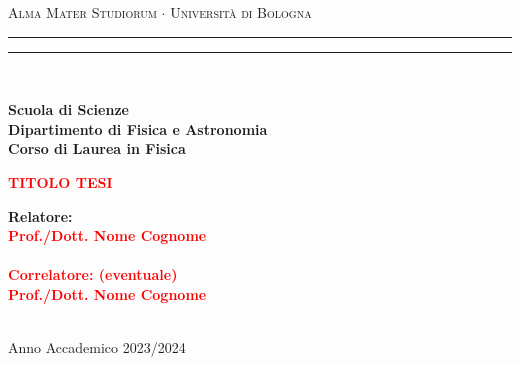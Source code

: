 \documentclass[12pt,a4paper,twoside]{report}
\begin{document}
	\begin{titlepage}
		\begin{center}
			{{\Large{\textsc{Alma Mater Studiorum $\cdot$ Universit\`a di Bologna}}}} 
			\rule[0.1cm]{15.8cm}{0.1mm}
			\rule[0.5cm]{15.8cm}{0.6mm}
			\\\vspace{3mm}
			
			{\small{\bf Scuola di Scienze \\ 
					Dipartimento di Fisica e Astronomia\\
					Corso di Laurea in Fisica}}
			
		\end{center}
		
		\vspace{23mm}
		
		\begin{center}\textcolor{red}{
				{\LARGE{\bf TITOLO TESI}}\\
		}\end{center}
		
		\vspace{50mm} \par \noindent
		
		\begin{minipage}[t]{0.47\textwidth}
			{\large{\bf Relatore: \vspace{2mm}\\\textcolor{red}{
						Prof./Dott. Nome Cognome}\\\\
					\textcolor{red}{
						\bf Correlatore: (eventuale)
						\vspace{2mm}\\
						Prof./Dott. Nome Cognome\\\\}}}
		\end{minipage}
		\hfill
		\begin{minipage}[t]{0.47\textwidth}
		\end{minipage}
		
		\vspace{40mm}
		
		\begin{center}
			Anno Accademico { 2023/2024}
		\end{center}
		
	\end{titlepage}
	\newpage
	\doublespacing %
\end{document}
